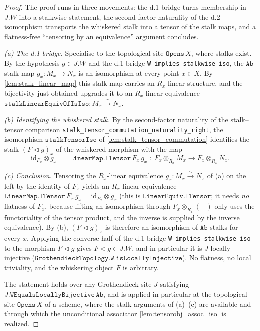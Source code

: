 \begin{proof}
  \leanok
  The proof runs in three movements: the d.1-bridge turns membership in \(J.W\) into a
  stalkwise statement, the second-factor naturality of the d.2 isomorphism transports
  the whiskered stalk into a tensor of the stalk maps, and a flatness-free
  ``tensoring by an equivalence'' argument concludes.

  \emph{(a) The d.1-bridge.} Specialise to the topological site \(\mathtt{Opens}\,X\),
  where stalks exist. By the hypothesis \(g \in J.W\) and the d.1-bridge
  \texttt{W\_implies\_stalkwise\_iso}, the \(\mathtt{Ab}\)-stalk map \(g_x : M_x \to N_x\)
  is an isomorphism at every point \(x \in X\). By \cref{lem:stalk_linear_map} this
  stalk map carries an \(R_x\)-linear structure, and the bijectivity just obtained
  upgrades it to an \(R_x\)-linear equivalence
  \(\mathtt{stalkLinearEquivOfIsIso} : M_x \xrightarrow{\sim} N_x\).

  \emph{(b) Identifying the whiskered stalk.} By the second-factor naturality of the
  stalk--tensor comparison \texttt{stalk\_tensor\_commutation\_naturality\_right}, the
  isomorphism \(\mathtt{stalkTensorIso}\) of \cref{lem:stalk_tensor_commutation}
  identifies the stalk \((F \triangleleft g)_x\) of the whiskered morphism with the
  map
  \[
    \mathrm{id}_{F_x} \otimes g_x \;=\; \mathtt{LinearMap.lTensor}\,F_x\,g_x
      \;\colon\; F_x \otimes_{R_x} M_x \longrightarrow F_x \otimes_{R_x} N_x .
  \]

  \emph{(c) Conclusion.} Tensoring the \(R_x\)-linear equivalence
  \(g_x : M_x \xrightarrow{\sim} N_x\) of (a) on the left by the identity of \(F_x\)
  yields an \(R_x\)-linear equivalence
  \(\mathtt{LinearMap.lTensor}\,F_x\,g_x = \mathrm{id}_{F_x} \otimes g_x\)
  (this is \(\mathtt{LinearEquiv.lTensor}\); it needs \emph{no} flatness of \(F_x\),
  because lifting an isomorphism through \(F_x \otimes_{R_x} (-)\) only uses the
  functoriality of the tensor product, and the inverse is supplied by the inverse
  equivalence). By (b), \((F \triangleleft g)_x\) is therefore an isomorphism of
  \(\mathtt{Ab}\)-stalks for every \(x\). Applying the converse half of the d.1-bridge
  \texttt{W\_implies\_stalkwise\_iso} to the morphism \(F \triangleleft g\) gives
  \(F \triangleleft g \in J.W\), and in particular it is \(J\)-locally injective
  (\(\mathtt{GrothendieckTopology.W.isLocallyInjective}\)). No flatness, no local
  triviality, and the whiskering object \(F\) is arbitrary.

  The statement holds over any Grothendieck site \(J\) satisfying
  \(J.\mathtt{WEqualsLocallyBijective}\,\mathtt{Ab}\), and is applied in particular
  at the topological site \(\mathtt{Opens}\,X\) of a scheme, where the stalk
  arguments of (a)--(c) are available and through which the unconditional associator
  \cref{lem:tensorobj_assoc_iso} is realized.
\end{proof}

